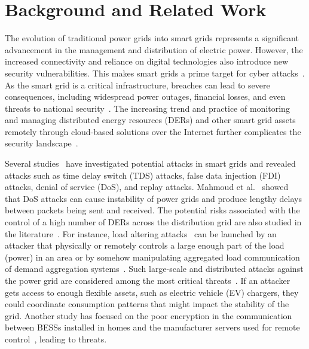 \section{Background and Related Work}
\label{section:related_work}

The evolution of traditional power grids into smart grids represents a significant advancement in the management and distribution of electric power. However, the increased connectivity and reliance on digital technologies also introduce new security vulnerabilities. This makes smart grids a prime target for cyber attacks~\cite{flex-threat}. As the smart grid is a critical infrastructure, breaches can lead to severe consequences, including widespread power outages, financial losses, and even threats to national security~\cite{iva_svängmassa}. The increasing trend and practice of monitoring and managing distributed energy resources (DERs) and other smart grid assets remotely through cloud-based solutions over the Internet further complicates the security landscape~\cite{Trevizan_2022, Naseri_2023, Kharlamova_2020}.

Several studies~\cite{mohan2020comprehensive, mohammad2023, smartgrid-dos} have investigated potential attacks in smart grids and revealed attacks such as time delay switch (TDS) attacks, false data injection (FDI) attacks, denial of service (DoS), and replay attacks. Mahmoud et al.~\cite{mahmoud2019modeling} showed that DoS attacks can cause instability of power grids and produce lengthy delays between packets being sent and received. The potential risks associated with the control of a high number of DERs across the distribution grid are also studied in the literature~\cite{dabrowski_load_altering}. For instance, load altering attacks~\cite{dabrowski_load_altering} can be launched by an attacker that physically or remotely controls a large enough part of the load (power) in an area or by somehow manipulating aggregated load communication of demand aggregation systems~\cite{mohan2020comprehensive}. Such large-scale and distributed attacks against the power grid are considered among the most critical threats~\cite{Trevizan_2022}. If an attacker gets access to enough flexible assets, such as electric vehicle (EV) chargers, they could coordinate consumption patterns that might impact the stability of the grid. Another study has focused on the poor encryption in the communication between BESSs installed in homes and the manufacturer servers used for remote control~\cite{Baumgart_2019}, leading to threats. 

